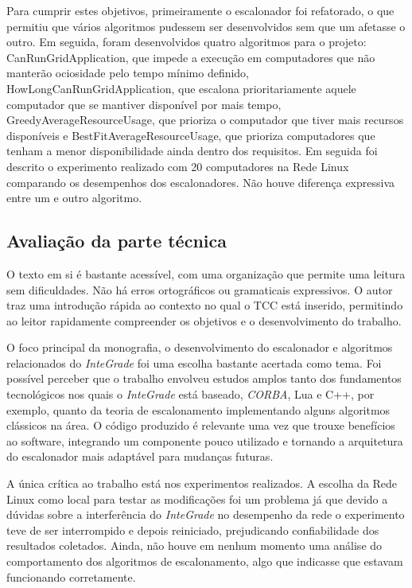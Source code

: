 \documentclass{article}
\begin{document}
	Para cumprir estes objetivos, primeiramente o escalonador foi refatorado, o que permitiu que vários algoritmos pudessem ser desenvolvidos sem que um afetasse o outro. Em seguida, foram desenvolvidos quatro algoritmos para o projeto: CanRunGridApplication, que impede a execução em computadores que não manterão ociosidade pelo tempo mínimo definido,  HowLongCanRunGridApplication, que escalona prioritariamente aquele computador que se mantiver disponível por mais tempo, GreedyAverageResourceUsage, que prioriza o computador que tiver mais recursos disponíveis e BestFitAverageResourceUsage, que prioriza computadores que tenham a menor disponibilidade ainda dentro dos requisitos. Em seguida foi descrito o experimento realizado com 20 computadores na Rede Linux comparando os desempenhos dos escalonadores. Não houve diferença expressiva entre um e outro algoritmo.
	
	
\subsection{Avaliação da parte técnica}
	O texto em si é bastante acessível, com uma organização que permite uma leitura sem dificuldades. Não há erros ortográficos ou gramaticais expressivos. O autor traz uma introdução rápida ao contexto no qual o TCC está inserido, permitindo ao leitor rapidamente compreender os objetivos e o desenvolvimento do trabalho.
	
	O foco principal da monografia, o desenvolvimento do escalonador e algoritmos relacionados do \emph{InteGrade} foi uma escolha bastante acertada como tema. Foi possível perceber que o trabalho envolveu estudos amplos tanto dos fundamentos tecnológicos nos quais o \emph{InteGrade} está baseado, \emph{CORBA}, Lua e C++, por exemplo, quanto da teoria de escalonamento implementando alguns algoritmos clássicos na área. O código produzido é relevante uma vez que trouxe benefícios ao software, integrando um componente pouco utilizado e tornando a arquitetura do escalonador mais adaptável para mudanças futuras.
	
	A única crítica ao trabalho está nos experimentos realizados. A escolha da Rede Linux como local para testar as modificações foi um problema já que devido a dúvidas sobre a interferência do \emph{InteGrade} no desempenho da rede o experimento teve de ser interrompido e depois reiniciado, prejudicando confiabilidade dos resultados coletados. Ainda, não houve em nenhum momento uma análise do comportamento dos algoritmos de escalonamento, algo que indicasse que estavam funcionando corretamente.
	
\end{document}
